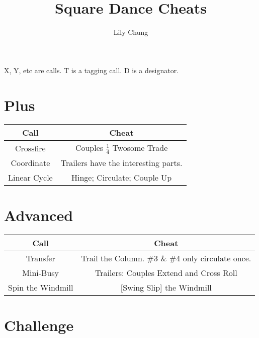 \documentclass{article}
\title{Square Dance Cheats}
\author{Lily Chung}
\date{}
\begin{document}
\maketitle

X, Y, etc are calls.  T is a tagging call.  D is a designator.

\section*{Plus}

\begin{center}
  \begin{tabular}{c | c}
    Call & Cheat \\ \hline
    Crossfire & Couples $\frac14$ Twosome Trade \\
    Coordinate & Trailers have the interesting parts. \\
    Linear Cycle & Hinge; Circulate; Couple Up \\
  \end{tabular}
\end{center}

\section*{Advanced}

\begin{tabular}{c | c}
  Call & Cheat \\ \hline
  Transfer & Trail the Column.  \#3 \& \#4 only circulate once. \\
  Mini-Busy & Trailers: Couples Extend and Cross Roll \\
  Spin the Windmill & [Swing Slip] the Windmill \\
\end{tabular}

\section*{Challenge}
\end{document}
